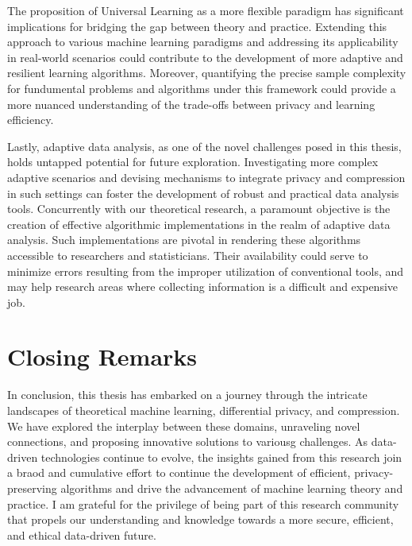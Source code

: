 The proposition of Universal Learning as a more flexible paradigm has significant implications for bridging the gap between theory and practice. Extending this approach to various machine learning paradigms and addressing its applicability in real-world scenarios could contribute to the development of more adaptive and resilient learning algorithms. Moreover, quantifying the precise sample complexity for fundumental problems and algorithms under this framework could provide a more nuanced understanding of the trade-offs between privacy and learning efficiency.

Lastly, adaptive data analysis, as one of the novel challenges posed in this thesis, holds untapped potential for future exploration. Investigating more complex adaptive scenarios and devising mechanisms to integrate privacy and compression in such settings can foster the development of robust and practical data analysis tools. Concurrently with our theoretical research, a paramount objective is the creation of effective algorithmic implementations in the realm of adaptive data analysis. Such implementations are pivotal in rendering these algorithms accessible to researchers and statisticians. Their availability could serve to minimize errors resulting from the improper utilization of conventional tools, and may help research areas where collecting information is a difficult and expensive job.

\section{Closing Remarks}
\label{sec:conclusion:closing}

In conclusion, this thesis has embarked on a journey through the intricate landscapes of theoretical machine learning, differential privacy, and compression. We have explored the interplay between these domains, unraveling novel connections, and proposing innovative solutions to variousg challenges. As data-driven technologies continue to evolve, the insights gained from this research join a braod and cumulative effort to continue the development of efficient, privacy-preserving algorithms and drive the advancement of machine learning theory and practice. I am grateful for the privilege of being part of this research community that propels our understanding and knowledge towards a more secure, efficient, and ethical data-driven future.



